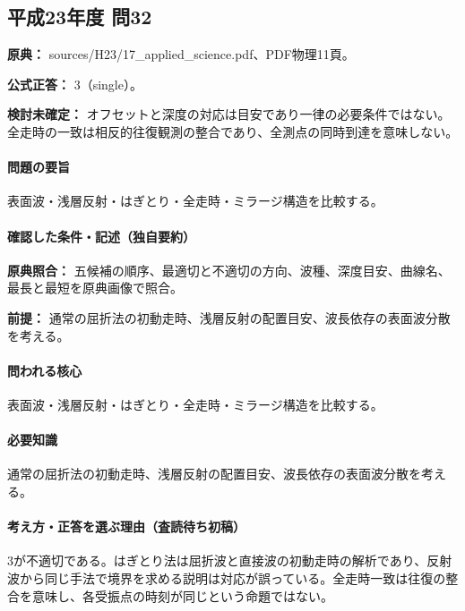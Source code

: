 \subsection{平成23年度 問32}
\label{q:h23-reg-applied-32}

\noindent\textbf{原典：} sources/H23/17\_applied\_science.pdf、PDF物理11頁。

\textbf{公式正答：} 3（single）。

\par\textbf{検討未確定：} オフセットと深度の対応は目安であり一律の必要条件ではない。全走時の一致は相反的往復観測の整合であり、全測点の同時到達を意味しない。

\paragraph{問題の要旨} 表面波・浅層反射・はぎとり・全走時・ミラージ構造を比較する。

\paragraph{確認した条件・記述（独自要約）}\mbox{}\par

\noindent\textbf{原典照合：} 五候補の順序、最適切と不適切の方向、波種、深度目安、曲線名、最長と最短を原典画像で照合。\par

\noindent\textbf{前提：} 通常の屈折法の初動走時、浅層反射の配置目安、波長依存の表面波分散を考える。\par

\paragraph{問われる核心} 表面波・浅層反射・はぎとり・全走時・ミラージ構造を比較する。

\paragraph{必要知識} 通常の屈折法の初動走時、浅層反射の配置目安、波長依存の表面波分散を考える。

\paragraph{考え方・正答を選ぶ理由（査読待ち初稿）} 3が不適切である。はぎとり法は屈折波と直接波の初動走時の解析であり、反射波から同じ手法で境界を求める説明は対応が誤っている。全走時一致は往復の整合を意味し、各受振点の時刻が同じという命題ではない。

